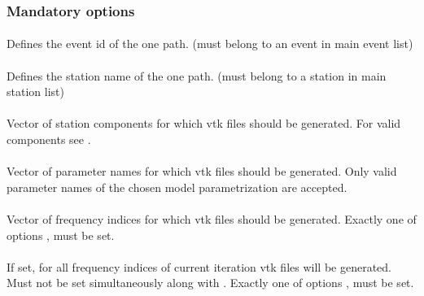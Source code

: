\subsubsection{Mandatory options}
\paragraph{ }
Defines the event id of the one path. (must belong to an event in main event list)
\paragraph{ }
Defines the station name of the one path. (must belong to a station in main station list)
\paragraph{}
Vector of station components for which vtk files should be generated. For valid components see .
\paragraph{}
Vector of parameter names for which vtk files should be generated. Only valid parameter names of the chosen model parametrization are accepted. 
\paragraph{}
Vector of  frequency indices for which vtk files should be generated. 
Exactly one of options  ,  must be set.
\paragraph{}
If set, for all frequency indices of current iteration vtk files will be generated. Must not be set simultaneously along with .
Exactly one of options  ,  must be set.
